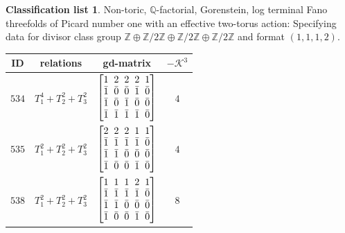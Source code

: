 \documentclass[10pt,a4paper]{amsart}
\theoremstyle{definition}
\newtheorem{class-list}[thm]{Classification list}
\def\ZZ{{\mathbb Z}}
\def\QQ{{\mathbb Q}}
\numberwithin{equation}{section}
\begin{document}
\begin{class-list}
Non-toric, $\QQ$-factorial, Gorenstein, log terminal Fano
threefolds of Picard number one with an effective two-torus action:
Specifying data for divisor class group
$\ZZ\oplus \ZZ/2\ZZ\oplus \ZZ/2\ZZ\oplus \ZZ/2\ZZ$ and format $(1,1,1,2)$.
\begin{table}[h!]\centering\setlength{\tabcolsep}{3.5pt}
\renewcommand{\arraystretch}{1.1}\small\tabulinesep=1mm
\begin{tabu}{c|c|c|c}
\hline
ID&relations&gd-matrix&$-\mathcal{K}^3$
\\
\hline
${534}$&${T_{1}^{4}+T_{2}^{2}+T_{3}^{2}}$
&$\arraycolsep=1mm\begin{bmatrix}{1} & {2} & {2} & {2} & {1} \\ {\bar{1}} & {\bar{0}} & {\bar{0}} & {\bar{1}} & {\bar{0}} \\ {\bar{1}} & {\bar{0}} & {\bar{1}} & {\bar{0}} & {\bar{0}} \\ {\bar{1}} & {\bar{1}} & {\bar{1}} & {\bar{1}} & {\bar{0}}\end{bmatrix}$
&${4}$
\\
\hline
${535}$&${T_{1}^{2}+T_{2}^{2}+T_{3}^{2}}$
&$\arraycolsep=1mm\begin{bmatrix}{2} & {2} & {2} & {1} & {1} \\ {\bar{1}} & {\bar{1}} & {\bar{1}} & {\bar{1}} & {\bar{0}} \\ {\bar{1}} & {\bar{1}} & {\bar{0}} & {\bar{0}} & {\bar{0}} \\ {\bar{1}} & {\bar{0}} & {\bar{0}} & {\bar{1}} & {\bar{0}}\end{bmatrix}$
&${4}$
\\
\hline
${538}$&${T_{1}^{2}+T_{2}^{2}+T_{3}^{2}}$
&$\arraycolsep=1mm\begin{bmatrix}{1} & {1} & {1} & {2} & {1} \\ {\bar{1}} & {\bar{1}} & {\bar{1}} & {\bar{1}} & {\bar{0}} \\ {\bar{1}} & {\bar{1}} & {\bar{0}} & {\bar{0}} & {\bar{0}} \\ {\bar{1}} & {\bar{0}} & {\bar{0}} & {\bar{1}} & {\bar{0}}\end{bmatrix}$
&${8}$
\\
\hline
\end{tabu}\vspace{-2mm}
\end{table}
\end{class-list}
\end{document}
